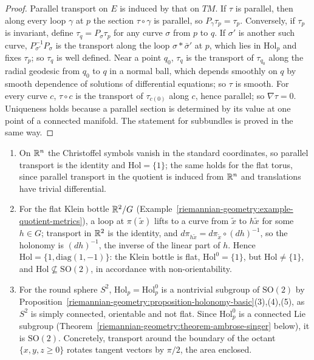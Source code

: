 \begin{proof}
Parallel transport on $E$ is induced by that on $TM$. If $\tau$ is parallel, then along every loop $\gamma$ at $p$ the section $\tau \circ \gamma$ is parallel, so $P_\gamma\tau_p = \tau_p$. Conversely, if $\tau_p$ is invariant, define $\tau_q = P_\sigma\tau_p$
for any curve $\sigma$ from $p$ to $q$. If $\sigma'$ is another such curve, $P_{\sigma'}^{-1}P_\sigma$ is the transport along the loop $\sigma * \bar\sigma'$ at $p$, which lies in $\mathrm{Hol}_p$ and fixes $\tau_p$; so
$\tau_q$ is well defined. Near a point $q_0$, $\tau_q$ is the transport of $\tau_{q_0}$ along the radial geodesic from $q_0$ to $q$ in a normal ball, which depends smoothly on $q$ by smooth dependence of solutions of
differential equations; so $\tau$ is smooth. For every curve $c$, $\tau \circ c$ is the transport of $\tau_{c(0)}$ along $c$, hence parallel; so $\nabla\tau = 0$. Uniqueness holds because a parallel section is determined by its value at one
point of a connected manifold. The statement for subbundles is proved in the same way.
\end{proof}

\begin{example}\label{riemannian-geometry:example-holonomy}
\begin{enumerate}
\item On $\mathbb{R}^n$ the Christoffel symbols vanish in the standard coordinates, so parallel transport is the identity and $\mathrm{Hol} = \{1\}$; the same holds for the flat torus, since parallel transport in the quotient is induced from
$\mathbb{R}^n$ and translations have trivial differential.
\item For the flat Klein bottle $\mathbb{R}^2/G$ (Example~\ref{riemannian-geometry:example-quotient-metrics}), a loop at $\pi(\tilde x)$ lifts to a curve from $\tilde x$ to $h\tilde x$ for some $h \in G$; transport in $\mathbb{R}^2$ is the identity, and
$d\pi_{h\tilde x} = d\pi_{\tilde x} \circ (dh)^{-1}$, so the holonomy is $(dh)^{-1}$, the inverse of the linear part of $h$. Hence $\mathrm{Hol} = \{1, \mathrm{diag}(1, -1)\}$: the Klein bottle is flat, $\mathrm{Hol}^0 = \{1\}$, but
$\mathrm{Hol} \neq \{1\}$, and $\mathrm{Hol} \not\subseteq \mathrm{SO}(2)$, in accordance with non-orientability.
\item For the round sphere $S^2$, $\mathrm{Hol}_p = \mathrm{Hol}^0_p$ is a nontrivial subgroup of $\mathrm{SO}(2)$ by Proposition~\ref{riemannian-geometry:proposition-holonomy-basic}(3),(4),(5), as $S^2$ is simply connected, orientable and
not flat. Since $\mathrm{Hol}^0_p$ is a connected Lie subgroup (Theorem~\ref{riemannian-geometry:theorem-ambrose-singer} below), it is $\mathrm{SO}(2)$. Concretely, transport around the boundary of the octant
$\{x, y, z \geq 0\}$ rotates tangent vectors by $\pi/2$, the area enclosed.
\end{enumerate}
\end{example}

